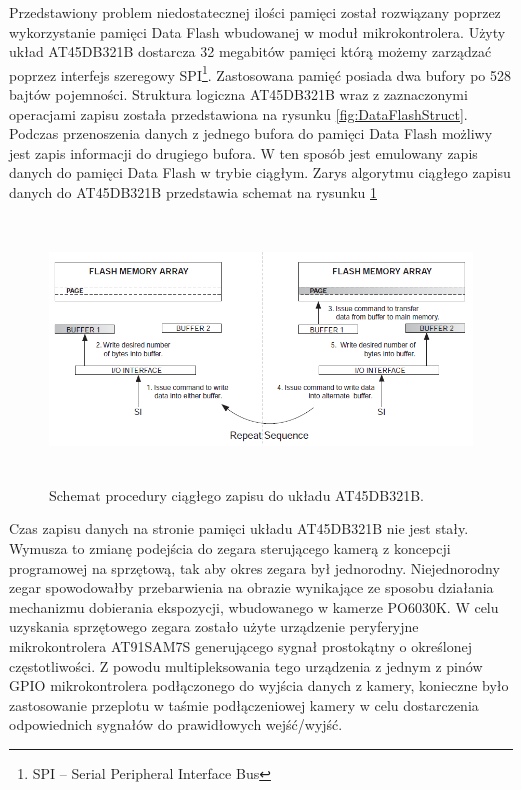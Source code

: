 Przedstawiony problem niedostatecznej ilości pamięci został rozwiązany poprzez wykorzystanie pamięci Data Flash wbudowanej w moduł mikrokontrolera. Użyty układ AT45DB321B\cite{AT45DB321BDataSheet} dostarcza 32 megabitów pamięci którą możemy zarządzać poprzez interfejs szeregowy SPI\footnote{SPI -- Serial Peripheral Interface Bus}. Zastosowana pamięć posiada dwa bufory po 528 bajtów pojemności. Struktura logiczna AT45DB321B wraz z zaznaczonymi operacjami zapisu została przedstawiona na rysunku \ref{fig:DataFlashStruct}.  Podczas przenoszenia danych z jednego bufora do pamięci Data Flash możliwy jest zapis informacji do drugiego bufora. W ten sposób jest emulowany zapis danych do pamięci Data Flash w trybie ciągłym. Zarys algorytmu ciągłego zapisu danych do AT45DB321B przedstawia schemat na rysunku \ref{fig:DataFlashConstantWrite}

\begin{figure}[ht!]
 \centering \includegraphics[height=70mm]{../images/ch04/dataflash_constant_write.png}
 \caption{Schemat procedury ciągłego zapisu do układu AT45DB321B\cite{AT45DB321BApplicationNote}.}
 \label{fig:DataFlashConstantWrite}
\end{figure}

Czas zapisu danych na stronie pamięci układu AT45DB321B nie jest stały. Wymusza to zmianę podejścia do zegara sterującego kamerą z koncepcji programowej na sprzętową, tak aby okres zegara był jednorodny. Niejednorodny zegar spowodowałby przebarwienia na obrazie wynikające ze sposobu działania mechanizmu dobierania ekspozycji, wbudowanego w kamerze PO6030K. W celu uzyskania sprzętowego zegara zostało użyte urządzenie peryferyjne mikrokontrolera AT91SAM7S generującego sygnał prostokątny o określonej częstotliwości. Z powodu multipleksowania tego urządzenia z jednym z pinów GPIO mikrokontrolera podłączonego do wyjścia danych z kamery, konieczne było zastosowanie przeplotu w taśmie podłączeniowej kamery w celu dostarczenia odpowiednich sygnałów do prawidłowych wejść/wyjść.

